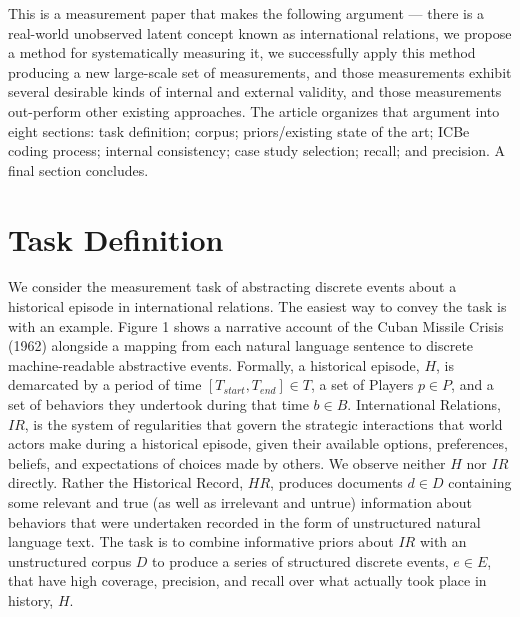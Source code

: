 \documentclass{article}
\begin{document}
This is a measurement paper that makes the following argument --- there
is a real-world unobserved latent concept known as international
relations, we propose a method for systematically measuring it, we
successfully apply this method producing a new large-scale set of
measurements, and those measurements exhibit several desirable kinds of
internal and external validity, and those measurements out-perform other
existing approaches. The article organizes that argument into eight
sections: task definition; corpus; priors/existing state of the art;
ICBe coding process; internal consistency; case study selection; recall;
and precision. A final section concludes.

\hypertarget{task-definition}{%
\section{Task Definition}\label{task-definition}}

We consider the measurement task of abstracting discrete events about a
historical episode in international relations. The easiest way to convey
the task is with an example. Figure 1 shows a narrative account of the
Cuban Missile Crisis (1962) alongside a mapping from each natural
language sentence to discrete machine-readable abstractive events.
Formally, a historical episode, \(H\), is demarcated by a period of time
\([T_{start}, T_{end}] \in T\), a set of Players \(p \in P\), and a set
of behaviors they undertook during that time \(b \in B\). International
Relations, \(IR\), is the system of regularities that govern the
strategic interactions that world actors make during a historical
episode, given their available options, preferences, beliefs, and
expectations of choices made by others. We observe neither \(H\) nor
\(IR\) directly. Rather the Historical Record, \(HR\), produces
documents \(d \in D\) containing some relevant and true (as well as
irrelevant and untrue) information about behaviors that were undertaken
recorded in the form of unstructured natural language text. The task is
to combine informative priors about \(IR\) with an unstructured corpus
\(D\) to produce a series of structured discrete events, \(e \in E\),
that have high coverage, precision, and recall over what actually took
place in history, \(H\).

\clearpage
\end{document}
